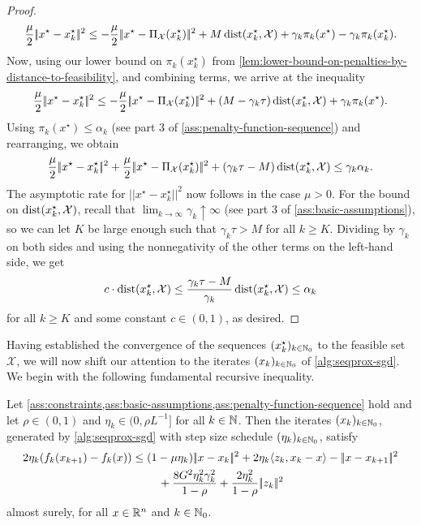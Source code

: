 \begin{proof}
    \[
        \frac{\mu}{2} |\!|x^\star - x_k^\star|\!|^2
        \leq
        -\frac{\mu}{2} |\!|x^\star - \operatorname{\Pi_\mathcal{X}}(x_k^\star)|\!|^2 + M \operatorname{dist}(x_k^\star, \mathcal{X})
        + \gamma_k\pi_k(x^\star) - \gamma_k\pi_k(x_k^\star).
    \]
    Now, using our lower bound on $\pi_k(x_k^\star)$ from \cref{lem:lower-bound-on-penalties-by-distance-to-feasibility},
    and combining terms, we arrive at the inequality
    \[
        \frac{\mu}{2} |\!|x^\star - x_k^\star|\!|^2
        \leq
        -\frac{\mu}{2} |\!|x^\star - \operatorname{\Pi_\mathcal{X}}(x_k^\star)|\!|^2 + (M - \gamma_k\tau) \operatorname{dist}(x_k^\star, \mathcal{X})
        + \gamma_k\pi_k(x^\star).
    \]
    Using $\pi_k(x^\star) \leq \alpha_k$ (see part 3 of \cref{ass:penalty-function-sequence}) and rearranging, we obtain
    \[
        \frac{\mu}{2} |\!|x^\star - x_k^\star|\!|^2
        +
        \frac{\mu}{2} |\!|x^\star - \operatorname{\Pi_\mathcal{X}}(x_k^\star)|\!|^2
        +
        (\gamma_k\tau - M) \operatorname{dist}(x_k^\star, \mathcal{X})
        \leq
        \gamma_k \alpha_k.
    \]
    The asymptotic rate for $|\!|x^\star - x_k^\star|\!|^2$ now follows
    in the case $\mu > 0$.
    For the bound on $\operatorname{dist}(x_k^\star, \mathcal{X})$, recall that $\lim_{k\to\infty} \gamma_k \uparrow \infty$
    (see part 3 of \cref{ass:basic-assumptions}),
    so we can let $K$ be large enough such that
    $\gamma_k\tau > M$ for all $k \geq K$. Dividing by $\gamma_k$ on both sides and using the nonnegativity
    of the other terms on the left-hand side, we get
    \[
        c \cdot \operatorname{dist}(x_k^\star, \mathcal{X})
        \leq
        \frac{\gamma_k\tau - M}{\gamma_k} \operatorname{dist}(x_k^\star, \mathcal{X})
        \leq
        \alpha_k
    \]
    for all $k \geq K$ and some constant $c\in(0,1)$, as desired.
\end{proof}
Having established the convergence of the sequences $(x_k^\star)_{k\in\mathbb{N}_0}$
to the feasible set $\mathcal{X}$, we will now shift our attention to the iterates $(x_k)_{k\in\mathbb{N}_0}$
of \cref{alg:seqprox-sgd}.
We begin with the following
fundamental recursive inequality.
\begin{lemma}
    \label{lem:one-step-improvement}
    Let \cref{ass:constraints,ass:basic-assumptions,ass:penalty-function-sequence} hold and
    let $\rho\in(0,1)$ and $\eta_k\in(0, \rho L^{-1}]$ for all $k\in\mathbb{N}$. Then
    the iterates $(x_k)_{k\in\mathbb{N}_0}$, generated by \cref{alg:seqprox-sgd} with step size
    schedule $(\eta_k)_{k\in\mathbb{N}_0}$, satisfy
    \begin{align}
        2\eta_k(f_k(x_{k+1}) - f_k(x))
        &\leq ( 1 - \mu\eta_k ) |\!|x - x_k|\!|^2 + 2\eta_k\langle z_k, x_k - x \rangle 
            - |\!|x - x_{k+1}|\!|^2 \notag \\
        &\phantom{===} +  \frac{8 G^2\eta_k^2\gamma_k^2}{1 - \rho} + \frac{2\eta_k^2}{1 - \rho}|\!|z_k|\!|^2
    \end{align}
    almost surely, for all $x\in\mathbb{R}^n$ and $k\in\mathbb{N}_0$.
\end{lemma}
